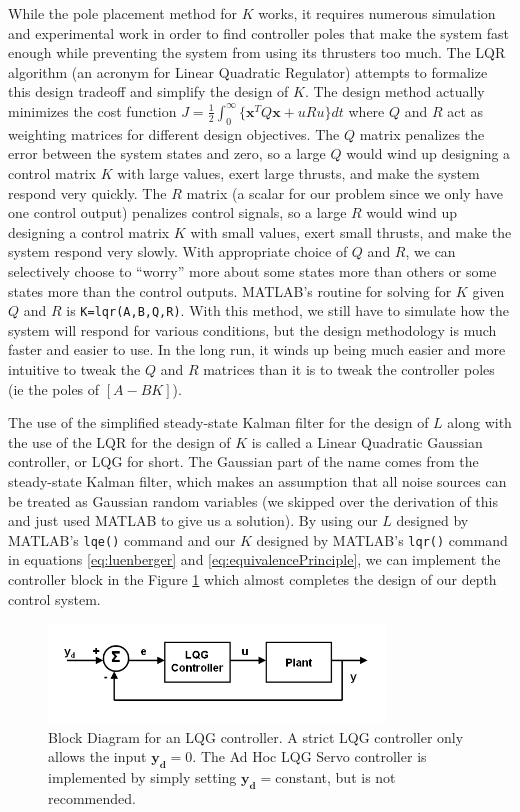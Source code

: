 \documentclass{article}
\begin{document}
While the pole placement method for $K$ works, it requires numerous simulation and experimental work in order to find controller poles that make the system fast enough while preventing the system from using its thrusters too much.  The LQR algorithm (an acronym for Linear Quadratic Regulator) attempts to formalize this design tradeoff and simplify the design of $K$.  The design method actually minimizes the cost function $J=\frac{1}{2}\int_{0}^{\infty}\{\pmb{x}^TQ\pmb{x}+uRu\}dt$ where $Q$ and $R$ act as weighting matrices for different design objectives.  The $Q$ matrix penalizes the error between the system states and zero, so a large $Q$ would wind up designing a control matrix $K$ with large values, exert large thrusts, and make the system respond very quickly.  The $R$ matrix (a scalar for our problem since we only have one control output) penalizes control signals, so a large $R$ would wind up designing a control matrix $K$ with small values, exert small thrusts, and make the system respond very slowly.  With appropriate choice of $Q$ and $R$, we can selectively choose to ``worry'' more about some states more than others or some states more than the control outputs.  MATLAB's routine for solving for $K$ given $Q$ and $R$ is \verb+K=lqr(A,B,Q,R)+.  With this method, we still have to simulate how the system will respond for various conditions, but the design methodology is much faster and easier to use.  In the long run, it winds up being much easier and more intuitive to tweak the $Q$ and $R$ matrices than it is to tweak the controller poles (ie the poles of $[A-BK]$).

The use of the simplified steady-state Kalman filter for the design of $L$ along with the use of the LQR for the design of $K$ is called a Linear Quadratic Gaussian controller, or LQG for short.  The Gaussian part of the name comes from the steady-state Kalman filter, which makes an assumption that all noise sources can be treated as Gaussian random variables (we skipped over the derivation of this and just used MATLAB to give us a solution).  By using our $L$ designed by MATLAB's \verb+lqe()+ command and our $K$ designed by MATLAB's \verb+lqr()+ command in equations \ref{eq:luenberger} and \ref{eq:equivalencePrinciple}, we can implement the controller block in the Figure \ref{fig:LQGBlockDiagram} which almost completes the design of our depth control system.

\begin{figure}[h]
\includegraphics[width=0.8\textwidth]{LQGBlockDiagram.png}
\centering
\caption{Block Diagram for an LQG controller.  A strict LQG controller only allows the input $\pmb{y_d}=0$.  The Ad Hoc LQG Servo controller is implemented by simply setting $\pmb{y_d}=$constant, but is not recommended.}
\label{fig:LQGBlockDiagram}
\end{figure}
\end{document}
